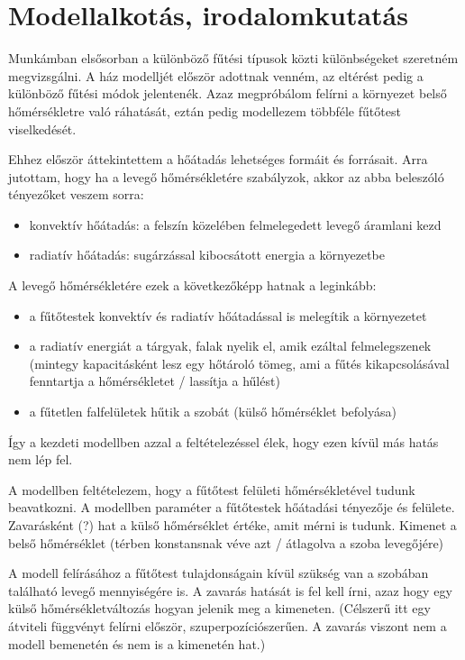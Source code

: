 \section{Modellalkotás, irodalomkutatás}

Munkámban elsősorban a különböző fűtési típusok közti különbségeket szeretném megvizsgálni. A ház modelljét először adottnak venném, az eltérést pedig a különböző fűtési módok jelentenék.
Azaz megpróbálom felírni a környezet belső hőmérsékletre való ráhatását, eztán pedig modellezem többféle fűtőtest viselkedését.

Ehhez először áttekintettem a hőátadás lehetséges formáit és forrásait. Arra jutottam, hogy ha a levegő hőmérsékletére szabályzok, akkor az abba beleszóló tényezőket veszem sorra:
\begin{itemize}[noitemsep,topsep=0pt,parsep=0pt,partopsep=0pt]
	\item konvektív hőátadás: a felszín közelében felmelegedett levegő áramlani kezd
	\item radiatív hőátadás: sugárzással kibocsátott energia a környezetbe
\end{itemize}


A levegő hőmérsékletére ezek a következőképp hatnak a leginkább:
\begin{itemize}[noitemsep,topsep=0pt,parsep=0pt,partopsep=0pt]
	\item a fűtőtestek konvektív és radiatív hőátadással is melegítik a környezetet
	\item a radiatív energiát a tárgyak, falak nyelik el, amik ezáltal felmelegszenek (mintegy kapacitásként lesz egy hőtároló tömeg, ami a fűtés kikapcsolásával fenntartja a hőmérsékletet / lassítja a hűlést)
	\item a fűtetlen falfelületek hűtik a szobát (külső hőmérséklet befolyása)
\end{itemize}

Így a kezdeti modellben azzal a feltételezéssel élek, hogy ezen kívül más hatás nem lép fel.

A modellben feltételezem, hogy a fűtőtest felületi hőmérsékletével tudunk beavatkozni. A modellben paraméter a fűtőtestek hőátadási tényezője és felülete. Zavarásként (?) hat a külső hőmérséklet értéke, amit mérni is tudunk. Kimenet a belső hőmérséklet (térben konstansnak véve azt / átlagolva a szoba levegőjére)

A modell felírásához a fűtőtest tulajdonságain kívül szükség van a szobában található levegő mennyiségére is. A zavarás hatását is fel kell írni, azaz hogy egy külső hőmérsékletváltozás hogyan jelenik meg a kimeneten. (Célszerű itt egy átviteli függvényt felírni először, szuperpozíciószerűen. A zavarás viszont nem a modell bemenetén és nem is a kimenetén hat.)

